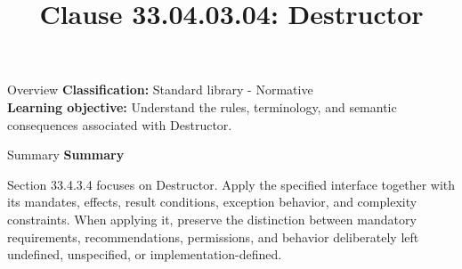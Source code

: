\documentclass[10pt,letterpaper]{article}
\title{Clause 33.04.03.04: Destructor}
\author{}
\date{}
\begin{document}
\maketitle
\begin{CornellOverviewBox}{Overview}
\textbf{Classification:} Standard library - Normative\\[2pt]
\textbf{Learning objective:} Understand the rules, terminology, and semantic consequences associated with Destructor.
\end{CornellOverviewBox}\begin{CornellSummaryBox}{Summary}
{\sffamily\bfseries\color{Accent} Summary}\par\vspace{3pt}Section 33.4.3.4 focuses on Destructor. Apply the specified interface together with its mandates, effects, result conditions, exception behavior, and complexity constraints. When applying it, preserve the distinction between mandatory requirements, recommendations, permissions, and behavior deliberately left undefined, unspecified, or implementation-defined.
\end{CornellSummaryBox}
\end{document}
